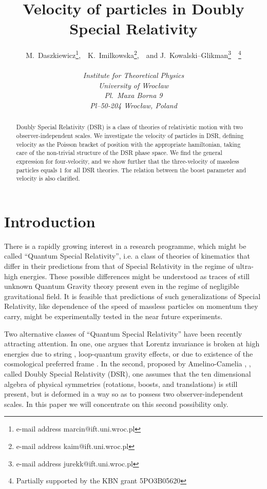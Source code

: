 \documentclass  [12pt] {article}
\begin{document}
\title{%
Velocity of particles in Doubly Special Relativity}
\author{M.\ Daszkiewicz\thanks{e-mail address marcin@ift.uni.wroc.pl},~~K.\
Imilkowska\thanks{e-mail address kaim@ift.uni.wroc.pl},~~and J.\
Kowalski--Glikman\thanks{e-mail address
jurekk@ift.uni.wroc.pl}~~\thanks{Partially supported by the   KBN
grant 5PO3B05620}\\  \\ {\em Institute for Theoretical
Physics}\\ {\em University of Wroc\l{}aw}\\ {\em Pl.\ Maxa Borna 9}\\
{\em Pl--50-204 Wroc\l{}aw, Poland}} \maketitle
\begin{abstract}
Doubly Special Relativity (DSR) is a class of theories of
relativistic motion with two observer-independent scales. We
investigate the velocity of particles in DSR, defining velocity as
the Poisson bracket of position with the appropriate hamiltonian,
taking care of the non-trivial structure of the DSR phase space.
We find the general expression for four-velocity, and  we show
further that the three-velocity of massless particles equals 1 for
all DSR theories. The relation between the boost parameter and
velocity is also clarified.

\end{abstract}
\clearpage

\section{Introduction}

There is a rapidly growing interest in a research programme, which
might be called ``Quantum Special Relativity'', i.e. a class of
theories of kinematics that differ in their predictions from that
of Special Relativity in the regime of ultra-high energies. These
possible differences might be understood as traces of still
unknown Quantum Gravity theory present even in the regime of
negligible gravitational field. It is feasible that predictions of
such generalizations of Special Relativity, like dependence of the
speed of massless particles on momentum they carry, might be
experimentally tested in the near future experiments.

Two alternative classes of ``Quantum Special Relativity'' have
been recently attracting  attention. In one, one argues that
Lorentz invariance is broken at high energies due to string
\cite{Colladay:1998fq}, loop-quantum gravity \cite{Gambini:1998it}
effects, or due to existence of the cosmological preferred frame
\cite{Jacobson:2001yj}. In the second, proposed by Amelino-Camelia
\cite{Amelino-Camelia:2000ge}, \cite{Amelino-Camelia:2000mn},
called Doubly Special Relativity (DSR), one assumes that the ten
dimensional algebra of physical symmetries (rotations, boosts, and
translations) is still present, but is deformed in a way so as to
possess two observer-independent scales. In this paper we will
concentrate on this second possibility only.
\end{document}
